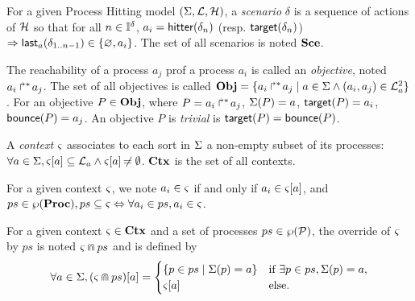 
\begin{definition}
\label{def:scenario}
  For a given Process Hitting model $(\Sigma,\mathcal{L},\mathcal{H})$,
  a \emph{scenario} $\delta$ is a sequence of actions of $\mathcal{H}$ so that for all $n \in \mathbb{I}^{\delta}$,
  $a_i = \mathsf{hitter}(\delta_n)$ (resp. $\mathsf{target}(\delta_n)$) $\Rightarrow \mathsf{last}_a(\delta_{1..n-1}) \in \{ \varnothing, a_i \}$.
  The set of all scenarios is noted $\mathbf{Sce}$.
\end{definition}

\begin{definition}
\label{def:obj}
  The reachability of a process $a_j$ prof a process $a_i$ is called an \emph{objective}, noted $\mbox{$a_i\Rsh^*\!a_j$}$.
  The set of all objectives is called $\mathbf{Obj} = \{ \mbox{$a_i\Rsh^*\!a_j$} \mid a \in \Sigma \wedge (a_i, a_j) \in \mathcal{L}_a^2 \}$.
  For an objective $P \in \mathbf{Obj}$, where $P = \mbox{$a_i\Rsh^*\!a_j$}$, $\Sigma(P) = a$, $\mathsf{target}(P)=a_i$, $\mathsf{bounce}(P)=a_j$.
  An objective $P$ is \emph{trivial} is $\mathsf{target}(P)=\mathsf{bounce}(P)$.
\end{definition}

\begin{definition}
\label{def:context}
  A \emph{context} $\varsigma$ associates to each sort in $\Sigma$ a non-empty subset of its processes:
  $\forall a \in \Sigma, {\varsigma[a]} \subseteq \mathcal{L}_a \wedge {\varsigma[a]} \not\nobreak\mkern -2mu = \emptyset$.
  $\mathbf{Ctx}$ is the set of all contexts.
\end{definition}

For a given context $\varsigma$, we note $a_i \in \varsigma$ if and only if $a_i \in {\varsigma[a]}$, and
$ps \in \wp(\mathbf{Proc}), ps \subseteq \varsigma \Leftrightarrow \forall a_i \in ps, a_i \in \varsigma$.
\begin{definition}[$\Cap: \Ctx \times \powerset(\PHproc) \mapsto \Ctx$]
\label{def:ctxcap}
  For a given context $\varsigma\in\mathbf{Ctx}$ and a set of processes $ps \in \wp(\mathcal{P})$,
  the override of $\varsigma$ by $ps$ is noted $\varsigma \Cap ps$ and is defined by
  \[ \forall a \in \Sigma, {(\varsigma \Cap ps)[a]} =
  \begin{cases}
    \{ p \in ps \mid \Sigma(p)=a \} & \text{if } \exists p \in ps, \Sigma(p)=a,\\
    {\varsigma[a]} & \text{else.}
  \end{cases}
  \]
\end{definition}

